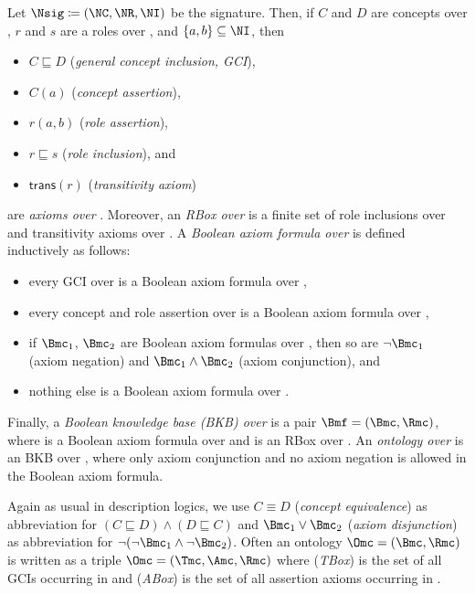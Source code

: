 \begin{definition}
  Let $\Nsig\coloneqq(\NC,\NR,\NI)$ be the signature. Then, if $C$ and $D$ are concepts over \Nsig, $r$
  and $s$ are a roles over \Nsig, and $\{a,b\}\subseteq\NI$, then
  \begin{itemize}
  \item $C \sqsubseteq D$ (\emph{general concept inclusion, GCI}),
  \item $C(a)$ (\emph{concept assertion}),
  \item $r(a,b)$ (\emph{role assertion}),
  \item $r \sqsubseteq s$ (\emph{role inclusion}), and
  \item $\mathsf{trans}(r)$ (\emph{transitivity axiom})
  \end{itemize}
  are \emph{axioms over \Nsig}.
  Moreover, an \emph{RBox \Rmc over \Nsig} is a finite set of role inclusions over \Nsig and
  transitivity axioms over \Nsig. A \emph{Boolean axiom formula over \Nsig} is defined inductively
  as follows:
  \begin{itemize}
  \item every GCI over \Nsig is a Boolean axiom formula over \Nsig,
  \item every concept and role assertion over \Nsig is a Boolean axiom formula over \Nsig,
  \item if $\Bmc_{1}$, $\Bmc_{2}$ are Boolean axiom formulas over \Nsig, then so are $\lnot\Bmc_{1}$
    (axiom negation) and $\Bmc_{1}\land\Bmc_{2}$ (axiom conjunction), and
  \item nothing else is a Boolean axiom formula over \Nsig.
  \end{itemize}
  Finally, a \emph{Boolean knowledge base (BKB) over \Nsig} is a pair
  $\Bmf = (\Bmc, \Rmc)$, where \Bmc is a Boolean axiom formula over \Nsig and \Rmc is an
  RBox over \Nsig. An \emph{ontology over \Nsig} is an BKB over \Nsig, where only
  axiom conjunction and no axiom negation is allowed in the Boolean axiom formula.
\end{definition}

\noindent
Again as usual in description logics, we use $C \equiv D$ (\emph{concept equivalence}) as abbreviation
for $(C \sqsubseteq D) \land (D \sqsubseteq C)$ and $\Bmc_1\lor\Bmc_2$ (\emph{axiom disjunction}) as
abbreviation for $\lnot(\lnot\Bmc_1\land\lnot\Bmc_2)$.
%
Often an ontology $\Omc = (\Bmc, \Rmc)$ is written as a triple $\Omc = (\Tmc, \Amc, \Rmc)$ where
\Tmc (\emph{TBox}) is the set of all GCIs occurring in \Bmc and \Amc (\emph{ABox}) is the set of all
assertion axioms occurring in \Bmc.



